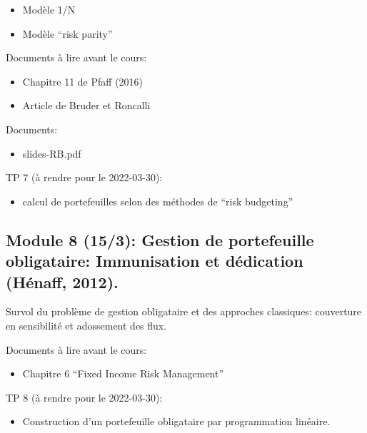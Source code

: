 \documentclass[
  11pt,
]{article}
\providecommand{\tightlist}{%
  \setlength{\itemsep}{0pt}\setlength{\parskip}{0pt}}
\begin{document}
\begin{itemize}
\tightlist
\item
  Modèle 1/N
\item
  Modèle ``risk parity''
\end{itemize}

Documents à lire avant le cours:

\begin{itemize}
\tightlist
\item
  Chapitre 11 de Pfaff (2016)
\item
  Article de Bruder et Roncalli
\end{itemize}

Documents:

\begin{itemize}
\tightlist
\item
  slides-RB.pdf
\end{itemize}

TP 7 (à rendre pour le 2022-03-30):

\begin{itemize}
\tightlist
\item
  calcul de portefeuilles selon des méthodes de ``risk budgeting''
\end{itemize}

\hypertarget{module-8-153-gestion-de-portefeuille-obligataire-immunisation-et-duxe9dication-henaff2012.}{%
\subsection{Module 8 (15/3): Gestion de portefeuille obligataire:
Immunisation et dédication (Hénaff,
2012).}\label{module-8-153-gestion-de-portefeuille-obligataire-immunisation-et-duxe9dication-henaff2012.}}

Survol du problème de gestion obligataire et des approches classiques:
couverture en sensibilité et adossement des flux.

Documents à lire avant le cours:

\begin{itemize}
\tightlist
\item
  Chapitre 6 ``Fixed Income Risk Management''
\end{itemize}

TP 8 (à rendre pour le 2022-03-30):

\begin{itemize}
\tightlist
\item
  Construction d'un portefeuille obligataire par programmation linéaire.
\end{itemize}
\end{document}
